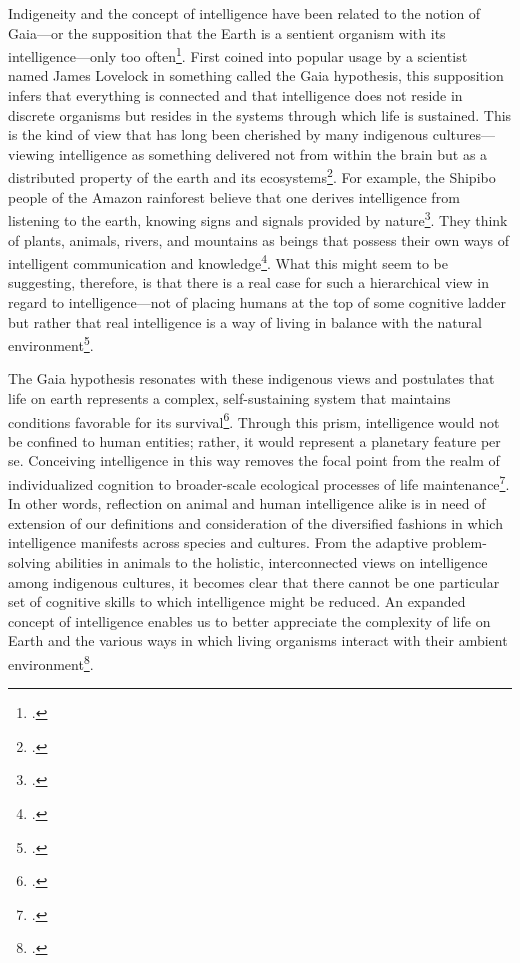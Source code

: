 \documentclass[12pt]{article}
\begin{document}
Indigeneity and the concept of intelligence have been related to the notion of Gaia—or the supposition that the Earth is a sentient organism with its intelligence—only too often\footcite{lovelock2000gaia}. First coined into popular usage by a scientist named James Lovelock in something called the Gaia hypothesis, this supposition infers that everything is connected and that intelligence does not reside in discrete organisms but resides in the systems through which life is sustained. This is the kind of view that has long been cherished by many indigenous cultures—viewing intelligence as something delivered not from within the brain but as a distributed property of the earth and its ecosystems\footcite{lovelock2000gaia}. For example, the Shipibo people of the Amazon rainforest believe that one derives intelligence from listening to the earth, knowing signs and signals provided by nature\footcite{berkes2012sacred}. They think of plants, animals, rivers, and mountains as beings that possess their own ways of intelligent communication and knowledge\footcite{berkes2012sacred}. What this might seem to be suggesting, therefore, is that there is a real case for such a hierarchical view in regard to intelligence—not of placing humans at the top of some cognitive ladder but rather that real intelligence is a way of living in balance with the natural environment\footcite{lovelock2000gaia}.

The Gaia hypothesis resonates with these indigenous views and postulates that life on earth represents a complex, self-sustaining system that maintains conditions favorable for its survival\footcite{lovelock2000gaia}. Through this prism, intelligence would not be confined to human entities; rather, it would represent a planetary feature per se. Conceiving intelligence in this way removes the focal point from the realm of individualized cognition to broader-scale ecological processes of life maintenance\footcite{lovelock2000gaia}. In other words, reflection on animal and human intelligence alike is in need of extension of our definitions and consideration of the diversified fashions in which intelligence manifests across species and cultures. From the adaptive problem-solving abilities in animals to the holistic, interconnected views on intelligence among indigenous cultures, it becomes clear that there cannot be one particular set of cognitive skills to which intelligence might be reduced. An expanded concept of intelligence enables us to better appreciate the complexity of life on Earth and the various ways in which living organisms interact with their ambient environment\footcite{dewaal2016are}.
\end{document}
